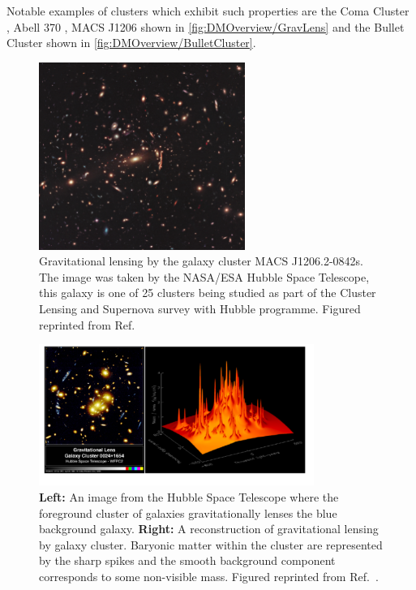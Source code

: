 Notable examples of clusters which exhibit such properties are the Coma Cluster \cite{Briel:1997hz}, Abell 370 \cite{Natarajan:2024iqm}, MACS J1206 \cite{GravLensPicture} shown in \autoref{fig:DMOverview/GravLens} and the Bullet Cluster \cite{Clowe2006} shown in \autoref{fig:DMOverview/BulletCluster}.
\begin{figure}[ht!]
	\centering
	\includegraphics[width=0.6\textwidth]{figures/DMOverview/GravLensIm.jpg}
	\caption[Gravitational lensing by the galaxy cluster MACS J1206.2-0842s.]{Gravitational lensing by the galaxy cluster MACS J1206.2-0842s. The image was taken by the NASA/ESA Hubble Space Telescope, this galaxy is one of 25 clusters being studied as part of the Cluster Lensing and Supernova survey with Hubble programme. Figured reprinted from Ref.~\cite{GravLensPicture}}
	\label{fig:DMOverview/GravLens}
\end{figure}
\begin{figure}[ht!]
	\centering
	\includegraphics[width=0.8\textwidth]{figures/DMOverview/Strong_Grav_lens.png}
	\caption[\textbf{Left:} Effects of gravitational lensing on multiple galaxies. \textbf{Right:} Reconstruction of gravitational lensing effects.]{\textbf{Left:} An image from the Hubble Space Telescope where the foreground cluster of galaxies gravitationally lenses the blue background galaxy. \textbf{Right:} A reconstruction of gravitational lensing by galaxy cluster. Baryonic matter within the cluster are represented by the sharp spikes and the smooth background component corresponds to some non-visible mass. Figured reprinted from Ref.~\cite{Freese2009}.}
	\label{fig:DMOverview/StrongGravLens}
\end{figure}
